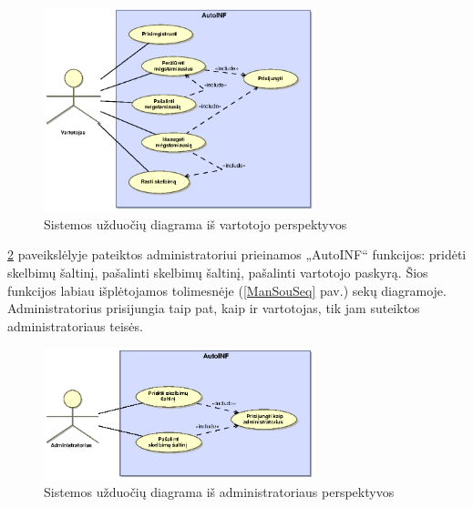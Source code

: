 \documentclass[12pt]{article}
\begin{document}
	\begin{figure}[h]
		\begin{center}
			\includegraphics[width=0.7\textwidth]{TikslaiVartotojas.eps}
			\caption{Sistemos užduočių diagrama iš vartotojo perspektyvos\label{UseCaseUser}}
		\end{center}
	\end{figure}
	
	\pagebreak	
	
	\ref{UseCaseAdmin} paveikslėlyje pateiktos administratoriui prieinamos „AutoINF“ funkcijos: pridėti skelbimų šaltinį, pašalinti skelbimų šaltinį, pašalinti vartotojo paskyrą. Šios funkcijos labiau išplėtojamos tolimesnėje (\ref{ManSouSeq} pav.) sekų diagramoje. Administratorius prisijungia taip pat, kaip ir vartotojas, tik jam suteiktos administratoriaus teisės.	
	
	\begin{figure}[h]
		\begin{center}
			\includegraphics[width=0.7\textwidth]{TikslaiAdministratorius.eps}
			\caption{Sistemos užduočių diagrama iš administratoriaus perspektyvos\label{UseCaseAdmin}}
		\end{center}
	\end{figure}	
	
\end{document}
